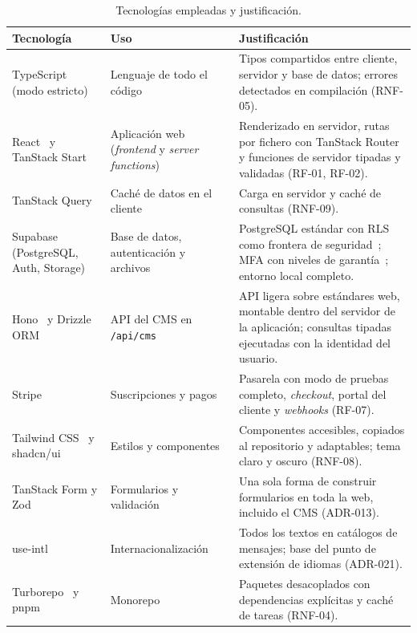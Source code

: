 \begin{table}[htbp]
  \centering
  \footnotesize
  \caption{Tecnologías empleadas y justificación.}
  \label{tab:plan-tecnologias}
  \begin{tabularx}{\textwidth}{@{}>{\raggedright\arraybackslash}p{3.3cm}>{\raggedright\arraybackslash}p{3.1cm}X@{}}
    \toprule
    \textbf{Tecnología} & \textbf{Uso} & \textbf{Justificación} \\
    \midrule
    TypeScript~\cite{typescript} (modo estricto) & Lenguaje de todo el código & Tipos compartidos entre cliente, servidor y base de datos; errores detectados en compilación (RNF-05). \\
    React~\cite{react} y TanStack Start~\cite{tanstack-start} & Aplicación web (\textit{frontend} y \textit{server functions}) & Renderizado en servidor, rutas por fichero con TanStack Router~\cite{tanstack-router} y funciones de servidor tipadas y validadas (RF-01, RF-02). \\
    TanStack Query~\cite{tanstack-query} & Caché de datos en el cliente & Carga en servidor y caché de consultas (RNF-09). \\
    Supabase~\cite{supabase-docs} (PostgreSQL, Auth, Storage) & Base de datos, autenticación y archivos & PostgreSQL estándar con RLS como frontera de seguridad~\cite{supabase-rls}; MFA con niveles de garantía~\cite{supabase-mfa}; entorno local completo. \\
    Hono~\cite{hono} y Drizzle ORM~\cite{drizzle} & API del CMS en \texttt{/api/cms} & API ligera sobre estándares web, montable dentro del servidor de la aplicación; consultas tipadas ejecutadas con la identidad del usuario. \\
    Stripe~\cite{stripe-docs} & Suscripciones y pagos & Pasarela con modo de pruebas completo, \textit{checkout}, portal del cliente y \textit{webhooks} (RF-07). \\
    Tailwind CSS~\cite{tailwind} y shadcn/ui~\cite{shadcn} & Estilos y componentes & Componentes accesibles, copiados al repositorio y adaptables; tema claro y oscuro (RNF-08). \\
    TanStack Form y Zod & Formularios y validación & Una sola forma de construir formularios en toda la web, incluido el CMS (ADR-013). \\
    use-intl & Internacionalización & Todos los textos en catálogos de mensajes; base del punto de extensión de idiomas (ADR-021). \\
    Turborepo~\cite{turborepo} y pnpm & Monorepo & Paquetes desacoplados con dependencias explícitas y caché de tareas (RNF-04). \\

\end{tabularx}
\end{table}
